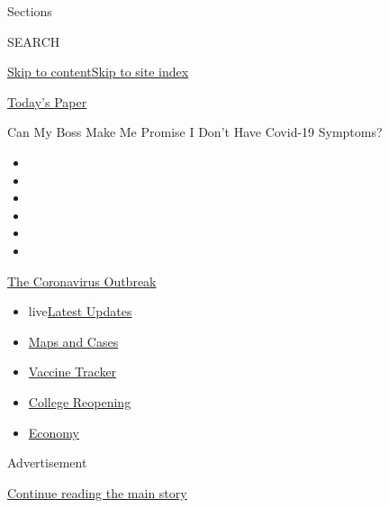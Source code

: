 Sections

SEARCH

\protect\hyperlink{site-content}{Skip to
content}\protect\hyperlink{site-index}{Skip to site index}

\href{https://myaccount.nytimes.com/auth/login?response_type=cookie\&client_id=vi}{}

\href{https://www.nytimes.com/section/todayspaper}{Today's Paper}

Can My Boss Make Me Promise I Don't Have Covid-19 Symptoms?

\begin{itemize}
\item
\item
\item
\item
\item
\item
\end{itemize}

\href{https://www.nytimes.com/news-event/coronavirus?action=click\&pgtype=Article\&state=default\&region=TOP_BANNER\&context=storylines_menu}{The
Coronavirus Outbreak}

\begin{itemize}
\tightlist
\item
  live\href{https://www.nytimes.com/2020/08/04/world/coronavirus-cases.html?action=click\&pgtype=Article\&state=default\&region=TOP_BANNER\&context=storylines_menu}{Latest
  Updates}
\item
  \href{https://www.nytimes.com/interactive/2020/us/coronavirus-us-cases.html?action=click\&pgtype=Article\&state=default\&region=TOP_BANNER\&context=storylines_menu}{Maps
  and Cases}
\item
  \href{https://www.nytimes.com/interactive/2020/science/coronavirus-vaccine-tracker.html?action=click\&pgtype=Article\&state=default\&region=TOP_BANNER\&context=storylines_menu}{Vaccine
  Tracker}
\item
  \href{https://www.nytimes.com/2020/08/02/us/covid-college-reopening.html?action=click\&pgtype=Article\&state=default\&region=TOP_BANNER\&context=storylines_menu}{College
  Reopening}
\item
  \href{https://www.nytimes.com/live/2020/08/04/business/stock-market-today-coronavirus?action=click\&pgtype=Article\&state=default\&region=TOP_BANNER\&context=storylines_menu}{Economy}
\end{itemize}

Advertisement

\protect\hyperlink{after-top}{Continue reading the main story}

